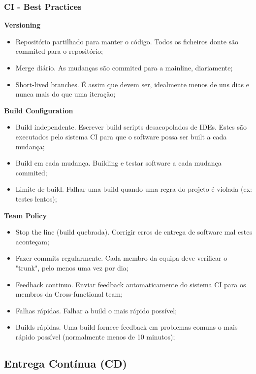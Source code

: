 \documentclass{article}
\begin{document}
\subsubsection{CI - Best Practices}

\begin{flushleft}
  \textbf{Versioning}
  \begin{itemize}
    \item Repositório partilhado para manter o código. Todos os
    ficheiros donte são commited para o repositório;
    \item Merge diário. As mudanças são commited para a mainline, diariamente;
    \item Short-lived branches. É assim que devem ser, idealmente menos de uns dias
    e nunca mais do que uma iteração;
  \end{itemize}

  \textbf{Build Configuration}
  \begin{itemize}
    \item Build independente. Escrever build scripts desacopolados de IDEs. Estes são executados pelo
    sistema CI para que o software possa ser built a cada mudança;
    \item Build em cada mudança. Building e testar software a cada mudança commited;
    \item Limite de build. Falhar uma build quando uma regra do projeto é violada (ex: testes lentos);
  \end{itemize}

  \pagebreak

  \textbf{Team Policy}
  \begin{itemize}
    \item Stop the line (build quebrada). Corrigir erros de entrega de software mal estes aconteçam;
    \item Fazer commits regularmente. Cada membro da equipa deve verificar o "trunk", pelo menos uma vez por dia;
    \item Feedback continuo. Enviar feedback automaticamente do sistema CI
    para os membros da Cross-functional team;
    \item Falhas rápidas. Falhar a build o mais rápido possível;
    \item Builds rápidas. Uma build fornece feedback em problemas
    comuns o mais rápido possível (normalmente menos de 10 minutos);
  \end{itemize}
\end{flushleft}

\subsection{Entrega Contínua (CD)}
\end{document}
